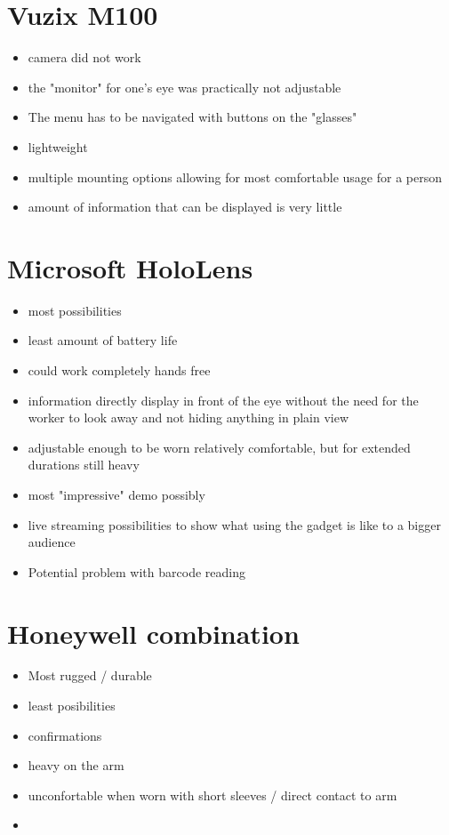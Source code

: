 \documentclass[a4paper]{report}
\begin{document}
\section*{Vuzix M100}
\begin{itemize}
	\item camera did not work
	\item the "monitor" for one's eye was practically not adjustable
	\item The menu has to be navigated with buttons on the "glasses"
	\item lightweight
	\item multiple mounting options allowing for most comfortable usage for a person
	\item amount of information that can be displayed is very little
\end{itemize}
\section*{Microsoft HoloLens}
\begin{itemize}
	\item most possibilities
	\item least amount of battery life
	\item could work completely hands free
	\item information directly display in front of the eye without the need for the worker to look away and not hiding anything in plain view
	\item adjustable enough to be worn relatively comfortable, but for extended durations still heavy
	\item most "impressive" demo possibly
	\item live streaming possibilities to show what using the gadget is like to a bigger audience
	\item Potential problem with barcode reading
\end{itemize}

\section*{Honeywell combination}
\begin{itemize}
	\item Most rugged / durable
	\item least posibilities
	\item confirmations 
	\item heavy on the arm
	\item unconfortable when worn with short sleeves / direct contact to arm
	\item 
\end{itemize}
\end{document}
